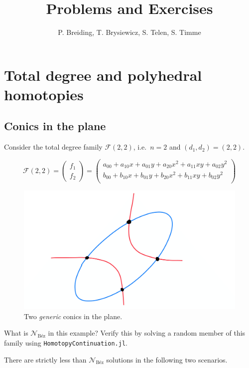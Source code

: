 \documentclass[11pt,reqno]{amsart}
\title{Problems and Exercises}
\author{P. Breiding, T. Brysiewicz, S. Telen, S. Timme}
\theoremstyle{definition}
\theoremstyle{remark}
\numberwithin{equation}{section}
\begin{document}
\maketitle

\section{Total degree and polyhedral homotopies}

\subsection{Conics in the plane}
Consider the total degree family $\mathcal{F}(2,2)$, i.e.~$n = 2$ and $(d_1, d_2) = (2,2)$. 

$$ \mathcal{F}(2,2) = \begin{pmatrix}
f_1 \\ f_2 
\end{pmatrix}  = \begin{pmatrix}
a_{00} + a_{10} x + a_{01} y + a_{20}x^2 + a_{11}xy + a_{02} y^2 \\
b_{00} + b_{10} x + b_{01} y + b_{20}x^2 + b_{11}xy + b_{02} y^2 \\
\end{pmatrix} $$
\begin{figure}
\centering
\includegraphics[scale=0.04]{Pictures_SANNA-4-1.png}
\caption{Two \emph{generic} conics in the plane.}
\end{figure}
What is $\mathcal{N}_{\text{Béz}}$ in this example? Verify this by solving a random member of this family using \texttt{HomotopyContinuation.jl}.

There are strictly less than $\mathcal{N}_{\text{Béz}}$  solutions in the following two scenarios.
\end{document}
